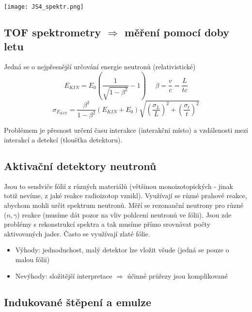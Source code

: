 \documentclass[../../main.tex]{subfiles}
\begin{document}
\begin{center}
	\texttt{[image: JS4\_spektr.png]}
\end{center}

\subsection{TOF spektrometry $\Rightarrow$ měření pomocí doby letu}

Jedná se o nejpřesnější určování energie neutronů (relativistické)
\begin{equation}
E_{KIN} = E_0 \left( \dfrac{1}{\sqrt{1 - \beta^2}} - 1\right) ~~~~~~ \beta = \dfrac{v}{c} = \dfrac{L}{tc} 
\end{equation}
\begin{equation}
\sigma _{E_{KIN}} = \dfrac{\beta^2}{1 - \beta^2} (E_{KIN} + E_0 )\sqrt{\left( \dfrac{\sigma_L}{L}\right)^2 + \left( \dfrac{\sigma_t}{t}\right)^2 }
\end{equation}

Problémem je přesnost určení času interakce (interakční místo) a vzdálenosti mezi interakcí a detekcí (tloušťka detektoru).

\subsection{Aktivační detektory neutronů}

Jsou to sendviče fólií z různých materiálů (většinou monoizotopických - jinak totiž nevíme, z jaké reakce radioizotop vznikl). Využívají se různé prahové reakce, abychom mohli určit spektrum neutronů. Měří se rezonanční neutrony pro různé ($n, \gamma$) reakce (musíme dát pozor na vliv pohlcení neutronů ve fólii). Jsou zde problémy s rekonstrukcí spektra a tak musíme přímo srovnávat počty aktivovaných jader. Často se využívají zlaté fólie.

\begin{itemize}
     \item Výhody: jednoduchost, malý detektor lze vložit všude (jedná se pouze o malou fólii)
      \item Nevýhody: složitější interpretace $\Rightarrow$ účinné průřezy jsou komplikované
\end{itemize}

\subsection{Indukované štěpení a emulze}
\end{document}
